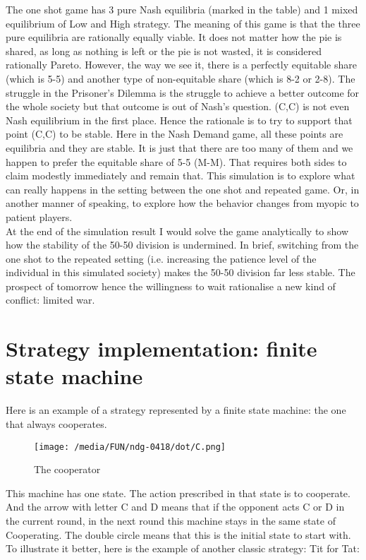 \documentclass[12.5pt]{report}
\begin{document}
The one shot game has 3 pure Nash equilibria (marked in the table) and 1 mixed equilibrium of Low and High strategy. The meaning of this game is that the three pure equilibria are rationally equally viable. It does not matter how the pie is shared, as long as nothing is left or the pie is not wasted, it is considered rationally Pareto. However, the way we see it, there is a perfectly equitable share (which is 5-5) and another type of non-equitable share (which is 8-2 or 2-8). The struggle in the Prisoner's Dilemma is the struggle to achieve a better outcome for the whole society but that outcome is out of Nash's question. (C,C) is not even Nash equilibrium in the first place. Hence the rationale is to try to support that point (C,C) to be stable. Here in the Nash Demand game, all these points are equilibria and they are stable. It is just that there are too many of them and we happen to prefer the equitable share of 5-5 (M-M). That requires both sides to claim modestly immediately and remain that. This simulation is to explore what can really happens in the setting between the one shot and repeated game. Or, in another manner of speaking, to explore how the behavior changes from myopic to patient players.\\

At the end of the simulation result I would solve the game analytically to show how the stability of the 50-50 division is undermined. In brief, switching from the one shot to the repeated setting (i.e. increasing the patience level of the individual in this simulated society) makes the 50-50 division far less stable. The prospect of tomorrow hence the willingness to wait rationalise a new kind of conflict: limited war.\\

\section{Strategy implementation: finite state machine}

Here is an example of a strategy represented by a finite state machine: the one that always cooperates.

\begin{figure}[h!]
\center
\texttt{[image: /media/FUN/ndg-0418/dot/C.png]}
\caption{The cooperator}
\end{figure}

This machine has one state. The action prescribed in that state is to cooperate. And the arrow with letter C and D means that if the opponent acts C or D in the current round, in the next round this machine stays in the same state of Cooperating. The double circle means that this is the initial state to start with. To illustrate it better, here is the example of another classic strategy: Tit for Tat:
\end{document}

